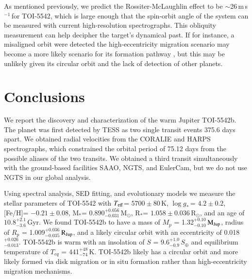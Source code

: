 \documentclass{aa}
\newcommand{\feh}{\mbox{[Fe/H]}\xspace}
\newcommand{\teff}{\ensuremath{T_{\rm eff}}\xspace}
\newcommand{\logg}{\mbox{$\log g_*$}\,}
\newcommand{\ms}{\mbox{m\,s$^{-1}$}}
\newcommand{\mjup}{\mbox{$\mathrm{M_{\rm Jup}}$}\xspace}
\newcommand{\rjup}{\mbox{$\mathrm{R_{\rm Jup}}$}\xspace}
\newcommand{\mstar}{\mbox{M$_{*}$}}
\newcommand{\rstar}{\mbox{R$_{*}$}}
\newcommand{\msol}{\mbox{$\mathrm{M_\odot}$}\xspace}
\newcommand{\rsol}{\mbox{$\mathrm{R_\odot}$}\xspace}
\begin{document}
As mentioned previously, we predict the Rossiter-McLaughlin effect to be $\sim$26\,\ms\,for TOI-5542, which is large enough that the spin-orbit angle of the system can be measured with current high-resolution spectrographs. This obliquity measurement can help decipher the target’s dynamical past. If for instance, a misaligned orbit were detected the high-eccentricity migration scenario may become a more likely scenario for its formation pathway \citep[e.g.,][]{Bourrier2018,Attia2021}, but this may be unlikely given its circular orbit and the lack of detection of other planets.

\section{Conclusions} \label{sec:conclusion}

We report the discovery and characterization of the warm Jupiter TOI-5542b. The planet was first detected by TESS as two single transit events 375.6 days apart. We obtained radial velocities from the CORALIE and HARPS spectrographs, which constrained the orbital period of 75.12 days from the possible aliases of the two transits. We obtained a third transit simultaneously with the ground-based facilities SAAO, NGTS, and EulerCam, but we do not use NGTS in our global analysis. 

Using spectral analysis, SED fitting, and evolutionary models we measure the stellar parameters of TOI-5542 with \teff = $5700\pm80$\,K, \logg = $4.2\pm0.2$, \feh = $-0.21\pm0.08$, \mstar = $0.890^{+0.056}_{-0.031}$\,\msol, \rstar = $1.058\pm0.036$\,\rsol, and an age of $10.8^{+2.1}_{-3.6}$\,Gyr. We found TOI-5542b to have a mass of $M_p$ = 1.32$^{+0.10}_{-0.10}$\,\mjup, radius of $R_p$ = 1.009$^{+0.036}_{-0.035}$\,\rjup, and a likely circular orbit with an eccentricity of 0.018$^{+0.026}_{-0.013}$. TOI-5542b is warm with an insolation of $S$ = 9.6$^{+1.0}_{-0.9}$\,$S_{\oplus}$ and equilibrium temperature of $T_{eq}$ = 441$^{+48}_{-74}$\,K. TOI-5542b likely has a circular orbit and more likely formed via disk migration or in situ formation rather than high-eccentricity migration mechanisms.  
\end{document}
